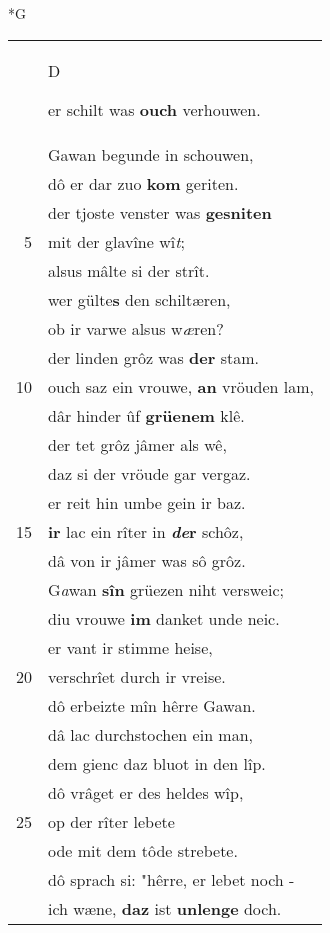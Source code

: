 \documentclass[8pt,a4paper,notitlepage]{article}
\begin{document}
\begin{table}[ht]
\begin{minipage}[t]{0.5\linewidth}
\small
\begin{center}*G
\end{center}
\begin{tabular}{rl}
 & \begin{large}D\end{large}er schilt was \textbf{ouch} verhouwen.\\ 
 & Gawan begunde in schouwen,\\ 
 & dô er dar zuo \textbf{kom} geriten.\\ 
 & der tjoste venster was \textbf{gesniten}\\ 
5 & mit der glavîne wî\textit{t};\\ 
 & alsus mâlte si der strît.\\ 
 & wer gülte\textbf{s} den schiltæren,\\ 
 & ob ir varwe alsus w\textit{æ}ren?\\ 
 & der linden grôz was \textbf{der} stam.\\ 
10 & ouch saz ein vrouwe, \textbf{an} vröuden lam,\\ 
 & dâr hinder ûf \textbf{grüenem} klê.\\ 
 & der tet grôz jâmer als wê,\\ 
 & daz si der vröude gar vergaz.\\ 
 & er reit hin umbe gein ir baz.\\ 
15 & \textbf{ir} lac ein rîter in \textbf{\textit{de}r} schôz,\\ 
 & dâ von ir jâmer was sô grôz.\\ 
 & G\textit{a}wan \textbf{sîn} grüezen niht versweic;\\ 
 & diu vrouwe \textbf{im} danket unde neic.\\ 
 & er vant ir stimme heise,\\ 
20 & verschrîet durch ir vreise.\\ 
 & dô erbeizte mîn hêrre Gawan.\\ 
 & dâ lac durchstochen ein man,\\ 
 & dem gienc daz bluot in den lîp.\\ 
 & dô vrâget er des heldes wîp,\\ 
25 & op der rîter lebete\\ 
 & ode mit dem tôde strebete.\\ 
 & dô sprach si: "hêrre, er lebet noch -\\ 
 & ich wæne, \textbf{daz} ist \textbf{unlenge} doch.\\ 

\end{tabular}
\end{minipage}
\end{table}
\end{document}
